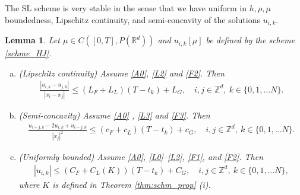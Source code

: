 \documentclass[a4paper,  twoside, 10pt, leqno]{amsart}
\newcommand{\Z}{\mathbb{Z}}
\newcommand{\rd}{\mathbb{R}^d}
\newtheorem{lemma}[thm]{Lemma}
\theoremstyle{remark}
\theoremstyle{definition}
\begin{document}
% 

 The SL scheme is very stable in the sense that we have uniform in
$h,\rho,\mu$  boundedness, Lipschitz continuity, and
semi-concavity of the solutions $u_{i,k}$. 

\begin{lemma}\label{lem:aprrox_HJB_reg} 
    Let $\mu \in  C ( [0,T], P ( \rd ))$ and $u_{i,k}[\mu]$ be defined by the scheme \eqref{schme_HJ}.
  \begin{enumerate}[(a)]
      \item (Lipschitz continuity) Assume \ref{A0}, \ref{L2} and \ref{F2}. Then   
                     \begin{align*}
                         \frac{|u_{i,k} - u_{j,k} |}{|x_{i} - x_{j}|} \leq  ( L_{F} + L_{L} )(T-t_k) + L_G  , \quad i,j \in \mathbb{Z}^{d}, \ k \in \{ 0,1, \ldots N \}. 
            \end{align*}
        \item (Semi-concavity) Assume \ref{A0} , \ref{L3} and \ref{F3}.   Then 
            \begin{align*}
                \frac{u_{i+j,k} - 2 u_{i,k} + u_{i-j,k}}{ |x_j|^2} \leq  ( c_F +c_L ) (T-t_k) + c_G, \quad i,j \in \mathbb{Z}^{d}, \ k \in \{ 0,1, \ldots N \} .
            \end{align*}
        \item (Uniformly bounded) Assume \ref{A0}, \ref{L0}--\ref{L2},
  \ref{F1}, and \ref{F2}. Then   
                     \begin{align*}
                         |u_{i,k}| \leq  (C_{F}+C_{L}(K))(T-t_k) + C_G, \quad i,j \in \mathbb{Z}^{d}, \ k \in \{ 0,1, \ldots N \},
                     \end{align*}
                     where $K$ is defined in Theorem \ref{thm:schm_prop} (i). 
    \end{enumerate}
\end{lemma}
\end{document}
